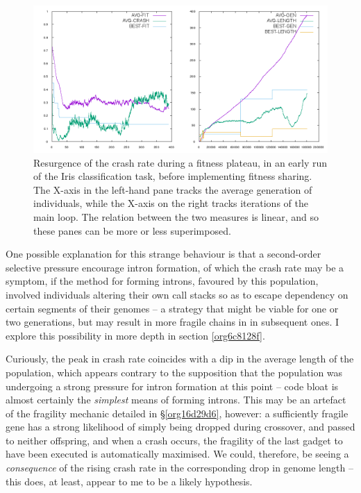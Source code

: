 \documentclass[12pt,glossary]{dalthesis}
\begin{document}
\begin{figure}[htbp]
\centering
\includegraphics[width=.9\linewidth]{../images/plots/good-nosharing.png}
\caption{\label{fig:orge4d7312}
Resurgence of the crash rate during a fitness plateau, in an early run of the Iris classification task, before implementing fitness sharing. The X-axis in the left-hand pane tracks the average generation of individuals, while the X-axis on the right tracks iterations of the main loop. The relation between the two measures is linear, and so these panes can be more or less superimposed.}
\end{figure}

One possible explanation for this strange behaviour is that a second-order selective
pressure encourage intron formation, of which the crash rate may be a symptom,
if the method for forming introns, favoured by this population, involved individuals
altering their own call stacks so as to escape dependency on certain segments of their
genomes -- a strategy that might be viable for one or two generations, but may result
in more fragile chains in in subsequent ones. I explore this possibility in more
depth in section \ref{org6c8128f}.

Curiously, the peak in crash rate coincides with a dip in the average length of the
population, which appears contrary to the supposition that the population was undergoing
a strong pressure for intron formation at this point -- code bloat is almost certainly
the \emph{simplest} means of forming introns. This may be an artefact of the fragility
mechanic detailed in \S \ref{org16d29d6}, however: a sufficiently fragile gene
has a strong likelihood of simply being dropped during crossover, and passed to neither
offspring, and when a crash occurs, the fragility of the last gadget to have been
executed is automatically maximised. We could, therefore, be seeing a \emph{consequence}
of the rising crash rate in the corresponding drop in genome length -- this does, at
least, appear to me to be a likely hypothesis.
\end{document}
